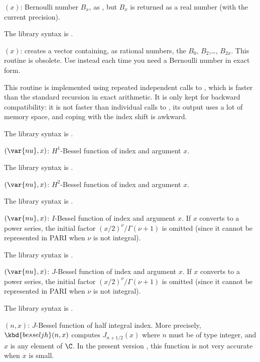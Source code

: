 $(x)$: \label{se:bernreal}Bernoulli number
$B_x$, as , but $B_x$ is returned as a real number
(with the current precision).

The library syntax is .

$(x)$: \label{se:bernvec}creates a vector containing, as rational numbers,
the  $B_0$, $B_2$,\dots, $B_{2x}$.
This routine is obsolete. Use  instead each time you need a
Bernoulli number in exact form.

 This routine is implemented using repeated independent
calls to , which is faster than the standard recursion in exact
arithmetic. It is only kept for backward compatibility: it is not faster than
individual calls to , its output uses a lot of memory space,
and coping with the index shift is awkward.

The library syntax is .

$(\var{nu},x)$: \label{se:besselh1}$H^1$-Bessel function of index  and argument $x$.

The library syntax is .

$(\var{nu},x)$: \label{se:besselh2}$H^2$-Bessel function of index  and argument $x$.

The library syntax is .

$(\var{nu},x)$: \label{se:besseli}$I$-Bessel function of index  and
argument $x$. If $x$ converts to a power series, the initial factor
$(x/2)^\nu/\Gamma(\nu+1)$ is omitted (since it cannot be represented in PARI
when $\nu$ is not integral).

The library syntax is .

$(\var{nu},x)$: \label{se:besselj}$J$-Bessel function of index  and
argument $x$. If $x$ converts to a power series, the initial factor
$(x/2)^\nu/\Gamma(\nu+1)$ is omitted (since it cannot be represented in PARI
when $\nu$ is not integral).

The library syntax is .

$(n,x)$: \label{se:besseljh}$J$-Bessel function of half integral index.
More precisely, $\kbd{besseljh}(n,x)$ computes $J_{n+1/2}(x)$ where $n$
must be of type integer, and $x$ is any element of $\C$. In the
present version \vers, this function is not very accurate when $x$ is small.

